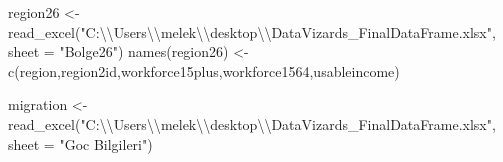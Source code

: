 \documentclass[
  11pt,
  a4paper,
  DIV=11,
  numbers=noendperiod]{scrartcl}
\newenvironment{Shaded}{\begin{snugshade}}{\end{snugshade}}
\newcommand{\AttributeTok}[1]{\textcolor[rgb]{0.40,0.45,0.13}{#1}}
\newcommand{\FunctionTok}[1]{\textcolor[rgb]{0.28,0.35,0.67}{#1}}
\newcommand{\NormalTok}[1]{\textcolor[rgb]{0.00,0.23,0.31}{#1}}
\newcommand{\OtherTok}[1]{\textcolor[rgb]{0.00,0.23,0.31}{#1}}
\newcommand{\SpecialCharTok}[1]{\textcolor[rgb]{0.37,0.37,0.37}{#1}}
\newcommand{\StringTok}[1]{\textcolor[rgb]{0.13,0.47,0.30}{#1}}
\begin{document}
\begin{Shaded}
\begin{Highlighting}[]
\NormalTok{region26 }\OtherTok{\textless{}{-}} \FunctionTok{read\_excel}\NormalTok{(}\StringTok{"C:}\SpecialCharTok{\textbackslash{}\textbackslash{}}\StringTok{Users}\SpecialCharTok{\textbackslash{}\textbackslash{}}\StringTok{melek}\SpecialCharTok{\textbackslash{}\textbackslash{}}\StringTok{desktop}\SpecialCharTok{\textbackslash{}\textbackslash{}}\StringTok{DataVizards\_FinalDataFrame.xlsx"}\NormalTok{, }\AttributeTok{sheet =} \StringTok{"Bolge26"}\NormalTok{)}
\FunctionTok{names}\NormalTok{(region26) }\OtherTok{\textless{}{-}} \FunctionTok{c}\NormalTok{(}\StringTok{\textquotesingle{}region\textquotesingle{}}\NormalTok{,}\StringTok{\textquotesingle{}region2id\textquotesingle{}}\NormalTok{,}\StringTok{\textquotesingle{}workforce15plus\textquotesingle{}}\NormalTok{,}\StringTok{\textquotesingle{}workforce1564\textquotesingle{}}\NormalTok{,}\StringTok{\textquotesingle{}usableincome\textquotesingle{}}\NormalTok{)}

\NormalTok{migration }\OtherTok{\textless{}{-}} \FunctionTok{read\_excel}\NormalTok{(}\StringTok{"C:}\SpecialCharTok{\textbackslash{}\textbackslash{}}\StringTok{Users}\SpecialCharTok{\textbackslash{}\textbackslash{}}\StringTok{melek}\SpecialCharTok{\textbackslash{}\textbackslash{}}\StringTok{desktop}\SpecialCharTok{\textbackslash{}\textbackslash{}}\StringTok{DataVizards\_FinalDataFrame.xlsx"}\NormalTok{, }\AttributeTok{sheet =} \StringTok{"Goc Bilgileri"}\NormalTok{)}


\end{Highlighting}
\end{Shaded}
\end{document}
